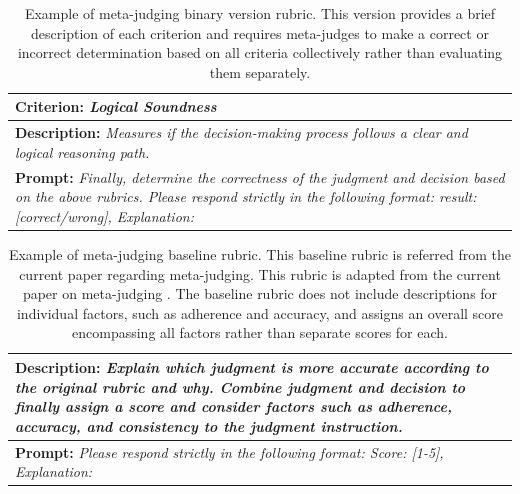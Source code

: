 \documentclass{article}
\theoremstyle{plain}
\theoremstyle{definition}
\theoremstyle{remark}
\begin{document}
\begin{table}[h!]
    \centering
    \setlength{\tabcolsep}{8pt} %
    \renewcommand{\arraystretch}{1.5} %
    \begin{tabular}{p{}}
        \toprule
       \rowcolor{gray!20} \textbf{Criterion:} \textit{Logical Soundness} \\
        \midrule 
         \textbf{Description:} 
         \textit{Measures if the decision-making process follows a clear and logical reasoning path.} \\
        \midrule
         \textbf{Prompt:} \textit{Finally, determine the correctness of the judgment and decision based on the above rubrics. Please respond strictly in the following format:  result: [correct/wrong], Explanation:}\\ 
        \bottomrule
    \end{tabular}
    \caption{Example of meta-judging binary version rubric. This version provides a brief description of each criterion and requires meta-judges to make a correct or incorrect determination based on all criteria collectively rather than evaluating them separately.}
    \label{tab:rubric-describe-2}
\end{table}

\begin{table}[h!]
    \centering
    \setlength{\tabcolsep}{8pt} %
    \renewcommand{\arraystretch}{1.5} %
    \begin{tabular}{p{}}
        \toprule
       \rowcolor{gray!20} \textbf{Description:} 
         \textit{Explain which judgment is more accurate according to the original rubric and why.
        Combine judgment and decision to finally assign a score and consider factors such as adherence, accuracy, and consistency to the judgment instruction.} \\
        \midrule
         \textbf{Prompt:} \textit{Please respond strictly in the following format:  Score: [1-5], Explanation:}\\ 
        \bottomrule
    \end{tabular}
    \caption{Example of meta-judging baseline rubric. This baseline rubric is referred from the current paper regarding meta-judging\cite{14-wu2024meta}. This rubric is adapted from the current paper on meta-judging \cite{14-wu2024meta}. The baseline rubric does not include descriptions for individual factors, such as adherence and accuracy, and assigns an overall score encompassing all factors rather than separate scores for each.}
    \label{tab:rubric-describe-3}
\end{table}
\end{document}
